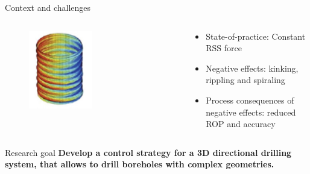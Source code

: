 \documentclass{beamer}
\begin{document}
\begin{frame}{Context and challenges}
		\begin{columns}[T]
		\hspace{1cm}	\begin{column}{0.5\textwidth}\setlength{\leftmargini}{0pt}
				\vspace{1cm}
				\begin{figure}[ht]\centering
					\includegraphics[width=0.5\textwidth]{images/Spiraling.png}
				\end{figure}
			\end{column}
			\begin{column}{0.6\textwidth}\setlength{\leftmargini}{0pt}
				\begin{itemize}
					\setlength\itemsep{3.5em}
					\item State-of-practice: Constant RSS force
					\item Negative effects: kinking, rippling and spiraling
					\item Process consequences of negative effects: reduced ROP and accuracy
				\end{itemize}			
			\end{column}
		\end{columns}
\end{frame}

\begin{frame}{Research goal}
	\textbf{\Large Develop a control strategy for a 3D directional drilling system, that allows to drill boreholes with complex geometries.}
\end{frame}
\end{document}
